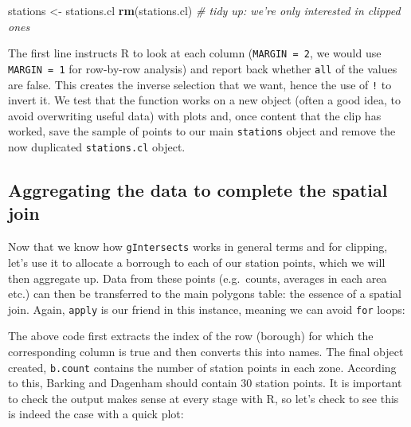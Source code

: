 \documentclass[]{article}
\newenvironment{Shaded}{}{}
\newcommand{\KeywordTok}[1]{\textcolor[rgb]{0.00,0.44,0.13}{\textbf{{#1}}}}
\newcommand{\DataTypeTok}[1]{\textcolor[rgb]{0.56,0.13,0.00}{{#1}}}
\newcommand{\DecValTok}[1]{\textcolor[rgb]{0.25,0.63,0.44}{{#1}}}
\newcommand{\CommentTok}[1]{\textcolor[rgb]{0.38,0.63,0.69}{\textit{{#1}}}}
\newcommand{\NormalTok}[1]{{#1}}
\begin{document}
\begin{Shaded}
\begin{Highlighting}[]
\NormalTok{stations <- stations.cl}
\KeywordTok{rm}\NormalTok{(stations.cl)  }\CommentTok{# tidy up: we're only interested in clipped ones}
\end{Highlighting}
\end{Shaded}
The first line instructs R to look at each column (\texttt{MARGIN = 2},
we would use \texttt{MARGIN = 1} for row-by-row analysis) and report
back whether \texttt{all} of the values are false. This creates the
inverse selection that we want, hence the use of \texttt{!} to invert
it. We test that the function works on a new object (often a good idea,
to avoid overwriting useful data) with plots and, once content that the
clip has worked, save the sample of points to our main \texttt{stations}
object and remove the now duplicated \texttt{stations.cl} object.

\subsection{Aggregating the data to complete the spatial join}

Now that we know how \texttt{gIntersects} works in general terms and for
clipping, let's use it to allocate a borrough to each of our station
points, which we will then aggregate up. Data from these points
(e.g.~counts, averages in each area etc.) can then be transferred to the
main polygons table: the essence of a spatial join. Again,
\texttt{apply} is our friend in this instance, meaning we can avoid
\texttt{for} loops:

\begin{Shaded}
\end{Shaded}
The above code first extracts the index of the row (borough) for which
the corresponding column is true and then converts this into names. The
final object created, \texttt{b.count} contains the number of station
points in each zone. According to this, Barking and Dagenham should
contain 30 station points. It is important to check the output makes
sense at every stage with R, so let's check to see this is indeed the
case with a quick plot:
\end{document}
